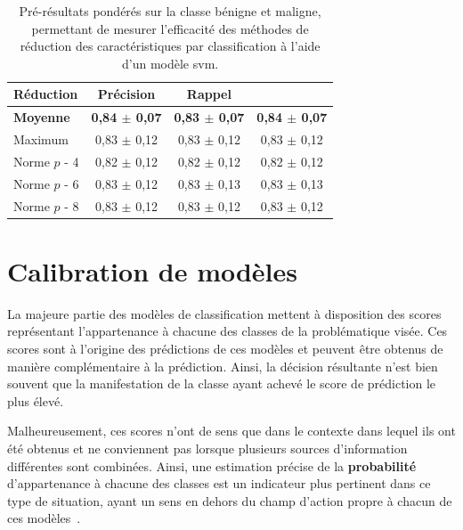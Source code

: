 \begin{table}[H]
    \centering
    \begin{tabular}{lccc} \toprule
        Réduction           & Précision             & Rappel                & \Fscore{}             \\ \midrule
        \textbf{Moyenne}    & \textbf{0,84 $\pm$ 0,07}& \textbf{0,83 $\pm$ 0,07}& \textbf{0,84 $\pm$ 0,07}\\
        Maximum             & 0,83 $\pm$ 0,12         & 0,83 $\pm$ 0,12         & 0,83 $\pm$ 0,12         \\
        Norme $p$ - 4       & 0,82 $\pm$ 0,12         & 0,82 $\pm$ 0,12         & 0,82 $\pm$ 0,12         \\
        Norme $p$ - 6       & 0,83 $\pm$ 0,12         & 0,83 $\pm$ 0,13         & 0,83 $\pm$ 0,13         \\
        Norme $p$ - 8       & 0,83 $\pm$ 0,12         & 0,83 $\pm$ 0,12         & 0,83 $\pm$ 0,12         \\ \bottomrule
    \end{tabular}
    \caption{Pré-résultats pondérés sur la classe bénigne et maligne, permettant de mesurer l'efficacité des méthodes de réduction des caractéristiques par classification à l'aide d'un modèle \gls{svm}.}
    \label{tab:results_multimodality_weighted_microscopy}
\end{table}

\clearpage

\section{Calibration de modèles}
\label{sec:calibrate_models}
La majeure partie des modèles de classification mettent à disposition des scores représentant l'appartenance à chacune des classes de la problématique visée. Ces scores sont à l'origine des prédictions de ces modèles et peuvent être obtenus de manière complémentaire à la prédiction. Ainsi, la décision résultante n'est bien souvent que la manifestation de la classe ayant achevé le score de prédiction le plus élevé.\par

Malheureusement, ces scores n'ont de sens que dans le contexte dans lequel ils ont été obtenus et ne conviennent pas lorsque plusieurs sources d'information différentes sont combinées. Ainsi, une estimation précise de la \textbf{probabilité} d'appartenance à chacune des classes est un indicateur plus pertinent dans ce type de situation, ayant un sens en dehors du champ d'action propre à chacun de ces modèles~\cite{Zadrozny2002}.\par

